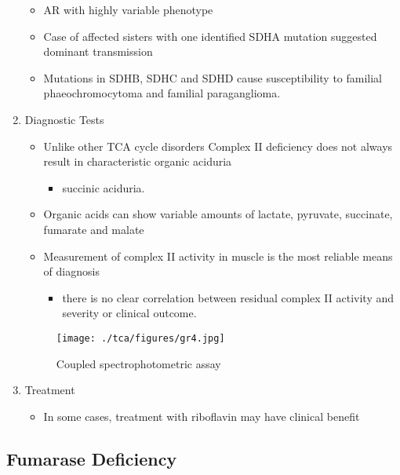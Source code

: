 \documentclass{scrartcl}
\begin{document}
\begin{enumerate}
\begin{itemize}
\item AR with highly variable phenotype
\item Case of affected sisters with one identified SDHA mutation suggested
dominant transmission
\item Mutations in SDHB, SDHC and SDHD cause susceptibility to familial
phaeochromocytoma and familial paraganglioma.
\end{itemize}

\item Diagnostic Tests
\label{sec:org51a906b}
\begin{itemize}
\item Unlike other TCA cycle disorders Complex II deficiency does not always
result in characteristic organic aciduria
\begin{itemize}
\item succinic aciduria.
\end{itemize}
\item Organic acids can show variable amounts of lactate, pyruvate, succinate, fumarate and malate
\item Measurement of complex II activity in muscle is the most reliable
means of diagnosis
\begin{itemize}
\item there is no clear correlation between residual complex II activity
and severity or clinical outcome.
\end{itemize}
\end{itemize}

\begin{figure}[htbp]
\centering
\texttt{[image: ./tca/figures/gr4.jpg]}
\caption{\label{fig:org8b1c72a}
Coupled spectrophotometric assay}
\end{figure}

\item Treatment
\label{sec:org6d37379}
\begin{itemize}
\item In some cases, treatment with riboflavin may have clinical benefit
\end{itemize}
\end{enumerate}

\subsection{Fumarase Deficiency}
\label{sec:org1db0b5d}
\end{document}
